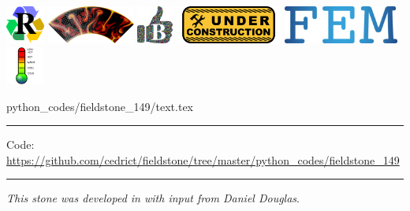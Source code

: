 \includegraphics[height=1.25cm]{images/pictograms/replication}
\includegraphics[height=1.25cm]{images/pictograms/aspect_logo}
\includegraphics[height=1.25cm]{images/pictograms/benchmark}
\includegraphics[height=1.25cm]{images/pictograms/under_construction}
\includegraphics[height=1.25cm]{images/pictograms/FEM}
\includegraphics[height=1.25cm]{images/pictograms/temperature}


\begin{flushright} {\tiny {\color{gray} python\_codes/fieldstone\_149/text.tex}} \end{flushright}



\par\noindent\rule{\textwidth}{0.4pt}

\begin{center}
\inpython
{\small Code: \url{https://github.com/cedrict/fieldstone/tree/master/python_codes/fieldstone_149}}
\end{center}

\par\noindent\rule{\textwidth}{0.4pt}

{\sl This stone was developed in with input from Daniel Douglas}. 

